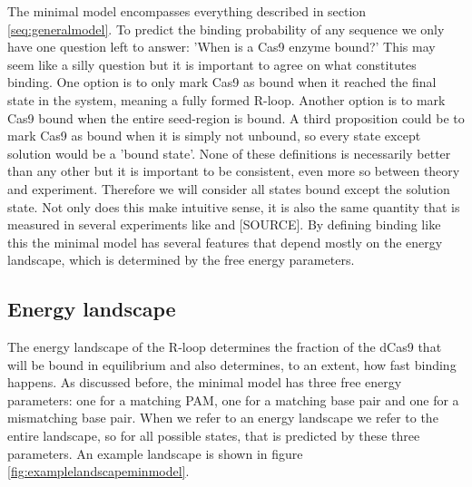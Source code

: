 The minimal model encompasses everything described in section \ref{seq:generalmodel}. To predict the binding probability of any sequence we only have one question left to answer: 'When is a Cas9 enzyme bound?' This may seem like a silly question but it is important to agree on what constitutes binding. One option is to only mark Cas9 as bound when it reached the final state in the system, meaning a fully formed R-loop. Another option is to mark Cas9 bound when the entire seed-region is bound. A third proposition could be to mark Cas9 as bound when it is simply not unbound, so every state except solution would be a 'bound state'. None of these definitions is necessarily better than any other but it is important to be consistent, even more so between theory and experiment. Therefore we will consider all states bound except the solution state. Not only does this make intuitive sense, it is also the same quantity that is measured in several experiments like \citep{PNAS} and [SOURCE]. By defining binding like this the minimal model has several features that depend mostly on the energy landscape, which is determined by the free energy parameters.

\subsection{Energy landscape}
The energy landscape of the R-loop determines the fraction of the dCas9 that will be bound in equilibrium and also determines, to an extent, how fast binding happens. As discussed before, the minimal model has three free energy parameters: one for a matching PAM, one for a matching base pair and one for a mismatching base pair. When we refer to an energy landscape we refer to the entire landscape, so for all possible states, that is predicted by these three parameters. An example landscape is shown in figure \ref{fig:examplelandscapeminmodel}.


